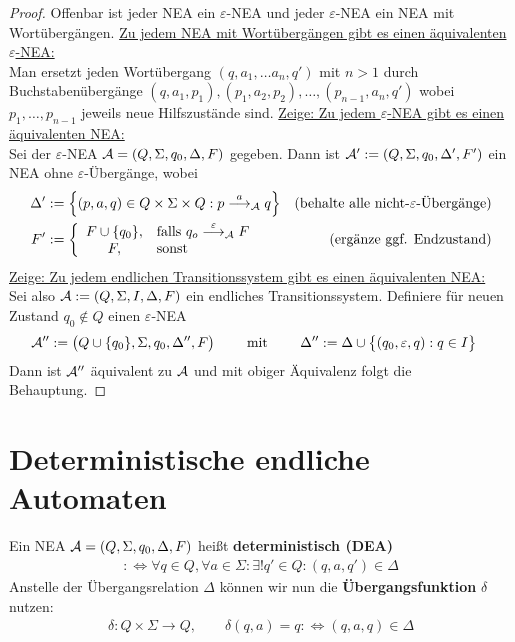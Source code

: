 \begin{proof}
	Offenbar ist jeder NEA ein $\varepsilon$-NEA und jeder $\varepsilon$-NEA ein NEA mit Wortübergängen.\nl
	\underline{Zu jedem NEA mit Wortübergängen gibt es einen äquivalenten $\varepsilon$-NEA:}\\
	Man ersetzt jeden Wortübergang $(q,a_1,\ldots a_n,q')$ mit $n>1$ durch Buchstabenübergänge $(q,a_1,p_1),(p_1,a_2,p_2),\ldots,(p_{n-1},a_n,q')$ wobei $p_1,\ldots,p_{n-1}$ jeweils neue Hilfszustände sind.\nl	
	\underline{Zeige: Zu jedem $\varepsilon$-NEA gibt es einen äquivalenten NEA:}\\
	Sei der $\varepsilon$-NEA $\mathcal{A}=(Q,\Sigma,q_0,\Delta,F)$ gegeben.
	Dann ist $\mathcal{A}':=(Q,\Sigma,q_0,\Delta', F')$ ein NEA ohne $\varepsilon$-Übergänge, wobei
	\begin{align*}
		\Delta'&:=\left\lbrace (p,a,q)\in Q\times \Sigma\times Q:p\overset{a}{\longrightarrow}_{\mathcal{A}} q\right\rbrace &\text{(behalte alle nicht-$\varepsilon$-Übergänge)}\\
		F'&:=\left\lbrace\begin{array}{cl}
			F\cup\lbrace q_0\rbrace ,&\text{falls } q_o\overset{\varepsilon}{\longrightarrow}_{\mathcal{A}} F\\
			F ,&\text{sonst }
		\end{array}\right. &\text{(ergänze ggf. Endzustand)}
	\end{align*}
	\underline{Zeige: Zu jedem endlichen Transitionssystem gibt es einen äquivalenten NEA:}\\
	Sei also $\mathcal{A}:=(Q,\Sigma,I,\Delta,F)$ ein endliches Transitionssystem.
	Definiere für neuen Zustand $q_0\not\in Q$ einen $\varepsilon$-NEA
	\begin{align*}
		\mathcal{A}''&:=\big(Q\cup\lbrace q_0\rbrace,\Sigma,q_0,\Delta'',F\big)\qquad\text{ mit }\qquad
		\Delta'':=\Delta\cup\big\lbrace(q_0,\varepsilon,q):q\in I\big\rbrace
	\end{align*}
	Dann ist $\mathcal{A}''$ äquivalent zu $\mathcal{A}$ und mit obiger Äquivalenz folgt die Behauptung.
\end{proof}

\section{Deterministische endliche Automaten}

\begin{definition}\label{def2.1}
	Ein NEA $\mathcal{A}=(Q,\Sigma,q_0,\Delta,F)$ heißt \textbf{deterministisch (DEA)} 
	\begin{align*}
		:\Longleftrightarrow\forall q\in Q,\forall a\in\Sigma:\exists! q'\in Q:(q,a,q')\in\Delta
	\end{align*}
	Anstelle der Übergangsrelation $\Delta$ können wir nun die \textbf{Übergangsfunktion} $\delta$ nutzen:
	\begin{align*}
		\delta:Q\times\Sigma\to Q,\qquad\delta(q,a)=q:\Longleftrightarrow(q,a,q)\in\Delta
	\end{align*}
\end{definition}


